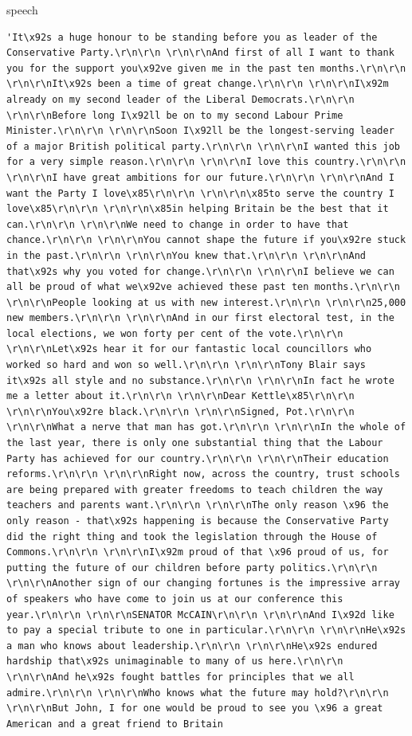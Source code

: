 \documentclass[
  letterpaper,
  DIV=11,
  numbers=noendperiod]{scrreprt}
\newenvironment{Shaded}{\begin{snugshade}}{\end{snugshade}}
\newcommand{\NormalTok}[1]{\textcolor[rgb]{0.00,0.23,0.31}{#1}}
\begin{document}
\begin{Shaded}
\begin{Highlighting}[]
\NormalTok{speech}
\end{Highlighting}
\end{Shaded}

\begin{verbatim}
'It\x92s a huge honour to be standing before you as leader of the Conservative Party.\r\n\r\n \r\n\r\nAnd first of all I want to thank you for the support you\x92ve given me in the past ten months.\r\n\r\n \r\n\r\nIt\x92s been a time of great change.\r\n\r\n \r\n\r\nI\x92m already on my second leader of the Liberal Democrats.\r\n\r\n \r\n\r\nBefore long I\x92ll be on to my second Labour Prime Minister.\r\n\r\n \r\n\r\nSoon I\x92ll be the longest-serving leader of a major British political party.\r\n\r\n \r\n\r\nI wanted this job for a very simple reason.\r\n\r\n \r\n\r\nI love this country.\r\n\r\n \r\n\r\nI have great ambitions for our future.\r\n\r\n \r\n\r\nAnd I want the Party I love\x85\r\n\r\n \r\n\r\n\x85to serve the country I love\x85\r\n\r\n \r\n\r\n\x85in helping Britain be the best that it can.\r\n\r\n \r\n\r\nWe need to change in order to have that chance.\r\n\r\n \r\n\r\nYou cannot shape the future if you\x92re stuck in the past.\r\n\r\n \r\n\r\nYou knew that.\r\n\r\n \r\n\r\nAnd that\x92s why you voted for change.\r\n\r\n \r\n\r\nI believe we can all be proud of what we\x92ve achieved these past ten months.\r\n\r\n \r\n\r\nPeople looking at us with new interest.\r\n\r\n \r\n\r\n25,000 new members.\r\n\r\n \r\n\r\nAnd in our first electoral test, in the local elections, we won forty per cent of the vote.\r\n\r\n \r\n\r\nLet\x92s hear it for our fantastic local councillors who worked so hard and won so well.\r\n\r\n \r\n\r\nTony Blair says it\x92s all style and no substance.\r\n\r\n \r\n\r\nIn fact he wrote me a letter about it.\r\n\r\n \r\n\r\nDear Kettle\x85\r\n\r\n \r\n\r\nYou\x92re black.\r\n\r\n \r\n\r\nSigned, Pot.\r\n\r\n \r\n\r\nWhat a nerve that man has got.\r\n\r\n \r\n\r\nIn the whole of the last year, there is only one substantial thing that the Labour Party has achieved for our country.\r\n\r\n \r\n\r\nTheir education reforms.\r\n\r\n \r\n\r\nRight now, across the country, trust schools are being prepared with greater freedoms to teach children the way teachers and parents want.\r\n\r\n \r\n\r\nThe only reason \x96 the only reason - that\x92s happening is because the Conservative Party did the right thing and took the legislation through the House of Commons.\r\n\r\n \r\n\r\nI\x92m proud of that \x96 proud of us, for putting the future of our children before party politics.\r\n\r\n \r\n\r\nAnother sign of our changing fortunes is the impressive array of speakers who have come to join us at our conference this year.\r\n\r\n \r\n\r\nSENATOR McCAIN\r\n\r\n \r\n\r\nAnd I\x92d like to pay a special tribute to one in particular.\r\n\r\n \r\n\r\nHe\x92s a man who knows about leadership.\r\n\r\n \r\n\r\nHe\x92s endured hardship that\x92s unimaginable to many of us here.\r\n\r\n \r\n\r\nAnd he\x92s fought battles for principles that we all admire.\r\n\r\n \r\n\r\nWho knows what the future may hold?\r\n\r\n \r\n\r\nBut John, I for one would be proud to see you \x96 a great American and a great friend to Britain 
\end{verbatim}
\end{document}
